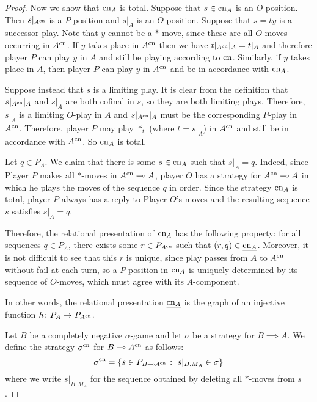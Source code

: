 \documentclass[11pt]{article} %
\begin{document}
\begin{proof}
  Now we show that $\operatorname{cn}_A$ is total.  Suppose that $s\in\operatorname{cn}_A$ is an $O$-position.  Then $s\vert_{A^{\operatorname{cn}}}$ is a $P$-position and $s\vert_A$ is an $O$-position.  Suppose that $s=ty$ is a successor play.  Note that $y$ cannot be a $*$-move, since these are all $O$-moves occurring in $A^{\operatorname{cn}}$.  If $y$ takes place in $A^{\operatorname{cn}}$ then we have $t\vert_{A^{\operatorname{cn}}}\vert_A=t\vert_A$ and therefore player $P$ can play $y$ in $A$ and still be playing according to $\operatorname{cn}$.  Similarly, if $y$ takes place in $A$, then player $P$ can play $y$ in $A^{\operatorname{cn}}$ and be in accordance with $\operatorname{cn}_A$.  

  Suppose instead that $s$ is a limiting play.  It is clear from the definition that $s\vert_{A^{\operatorname{cn}}}\vert_A$ and $s\vert_A$ are both cofinal in $s$, so they are both limiting plays.  Therefore, $s\vert_A$ is a limiting $O$-play in $A$ and $s\vert_{A^{\operatorname{cn}}}\vert_A$ must be the corresponding $P$-play in $A^{\operatorname{cn}}$.  Therefore, player $P$ may play $*_t$ (where $t=s\vert_A$) in $A^{\operatorname{cn}}$ and still be in accordance with $A^{\operatorname{cn}}$.  So $\operatorname{cn}_A$ is total.

  Let $q\in P_A$.  We claim that there is some $s\in\operatorname{cn}_A$ such that $s\vert_A=q$.  Indeed, since Player $P$ makes all $*$-moves in $A^{\operatorname{cn}}\multimap A$, player $O$ has a strategy for $A^{\operatorname{cn}}\multimap A$ in which he plays the moves of the sequence $q$ in order.  Since the strategy $\operatorname{cn}_A$ is total, player $P$ always has a reply to Player $O$'s moves and the resulting sequence $s$ satisfies $s\vert_A=q$.  

  Therefore, the relational presentation of $\operatorname{cn}_A$ has the following property: for all sequences $q\in P_A$, there exists some $r\in P_{A^{\operatorname{cn}}}$ such that $(r,q)\in\underline{\operatorname{cn}_A}$.  Moreover, it is not difficult to see that this $r$ is unique, since play passes from $A$ to $A^{\operatorname{cn}}$ without fail at each turn, so a $P$-position in $\operatorname{cn}_A$ is uniquely determined by its sequence of $O$-moves, which must agree with its $A$-component.  

  In other words, the relational presentation $\underline{\operatorname{cn}_A}$ is the graph of an injective function $h\colon P_A\to P_{A^{\operatorname{cn}}}$.

  Let $B$ be a completely negative $\alpha$-game and let $\sigma$ be a strategy for $B\implies A$.  We define the strategy $\sigma^{\operatorname{cn}}$ for $B\multimap A^{\operatorname{cn}}$ as follows:
  \[
    \sigma^{\operatorname{cn}} = \{s\in P_{B\multimap A^{\operatorname{cn}}}\;\colon\; s\vert_{B,M_A}\in\sigma\}
    \]
  where we write $s\vert_{B,M_A}$ for the sequence obtained by deleting all $*$-moves from $s$.  


\end{proof}
\end{document}
